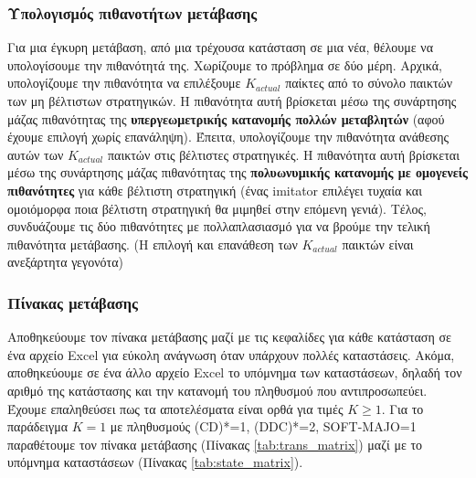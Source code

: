 \documentclass[a4paper,12pt]{article}
\begin{document}
\subsubsection*{Υπολογισμός πιθανοτήτων μετάβασης}
Για μια έγκυρη μετάβαση, από μια τρέχουσα κατάσταση σε μια νέα, θέλουμε να υπολογίσουμε την πιθανότητά της. Χωρίζουμε το πρόβλημα σε δύο μέρη.
Αρχικά, υπολογίζουμε την πιθανότητα να επιλέξουμε $K_{actual}$ παίκτες από το σύνολο παικτών των μη βέλτιστων στρατηγικών. Η πιθανότητα αυτή βρίσκεται μέσω της συνάρτησης μάζας πιθανότητας της \textbf{υπεργεωμετρικής κατανομής πολλών μεταβλητών} (αφού έχουμε επιλογή χωρίς επανάληψη).
Έπειτα, υπολογίζουμε την πιθανότητα ανάθεσης αυτών των $K_{actual}$ παικτών στις βέλτιστες στρατηγικές. Η πιθανότητα αυτή βρίσκεται μέσω της συνάρτησης μάζας πιθανότητας της \textbf{πολυωνυμικής κατανομής με ομογενείς πιθανότητες} για κάθε βέλτιστη στρατηγική (ένας \foreignlanguage{english}{imitator} επιλέγει τυχαία και ομοιόμορφα ποια βέλτιστη στρατηγική θα μιμηθεί στην επόμενη γενιά).
Τέλος, συνδυάζουμε τις δύο πιθανότητες με πολλαπλασιασμό για να βρούμε την τελική πιθανότητα μετάβασης. (Η επιλογή και επανάθεση των $K_{actual}$ παικτών είναι ανεξάρτητα γεγονότα)


\subsubsection*{Πίνακας μετάβασης}
Αποθηκεύουμε τον πίνακα μετάβασης μαζί με τις κεφαλίδες για κάθε κατάσταση σε ένα αρχείο \foreignlanguage{english}{Excel} για εύκολη ανάγνωση όταν υπάρχουν πολλές καταστάσεις. 
Ακόμα, αποθηκεύουμε σε ένα άλλο αρχείο \foreignlanguage{english}{Excel} το υπόμνημα των καταστάσεων, δηλαδή τον αριθμό της κατάστασης και την κατανομή του πληθυσμού που αντιπροσωπεύει.
Έχουμε επαληθεύσει πως τα αποτελέσματα είναι ορθά για τιμές $Κ \geq 1$. Για το παράδειγμα $K=1$ με πληθυσμούς \foreignlanguage{english}{(CD)*=1, (DDC)*=2, SOFT-MAJO=1} παραθέτουμε τον πίνακα μετάβασης (Πίνακας \ref{tab:trans_matrix}) μαζί με το υπόμνημα καταστάσεων (Πίνακας \ref{tab:state_matrix}).
\end{document}
